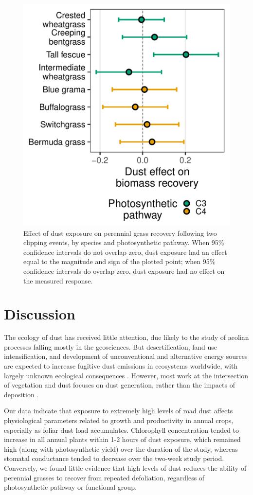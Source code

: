 \documentclass{svjour3}
\begin{document}
 

\begin{figure}
	\centering
	\includegraphics[width=0.6\linewidth]{figures/GrassCIs-1}
	\caption{Effect of dust exposure on perennial grass recovery following two clipping events, by species and photosynthetic pathway. 
		When 95\% confidence intervals do not overlap zero, dust exposure had an effect equal to the magnitude and sign of the plotted point; when 95\% confidence intervals do overlap zero, dust exposure had no effect on the measured response. \label{fig:grassCIs} }
\end{figure}


\clearpage 

\section{Discussion} 

The ecology of dust has received little attention, due likely to the study of aeolian processes falling mostly in the geosciences. 
But desertification, land use intensification, and development of unconventional and alternative energy sources are expected to increase fugitive dust emissions in ecosystems worldwide, with largely unknown ecological consequences \citep{field2010}.  
However, most work at the intersection of vegetation and dust focuses on dust generation, rather than the impacts of deposition \citep[e.g.,][]{belnap2014, flagg2014,nandintsetseg2015}. 

Our data indicate that exposure to extremely high levels of road dust affects physiological parameters related to growth and productivity in annual crops, especially as foliar dust load accumulates. 
Chlorophyll concentration tended to increase in all annual plants within 1-2 hours of dust exposure, which remained high (along with photosynthetic yield) over the duration of the study, whereas stomatal conductance tended to decrease over the two-week study period.
Conversely, we found little evidence that high levels of dust reduces the ability of perennial grasses to recover from repeated defoliation, regardless of photosynthetic pathway or functional group. 
\end{document}
